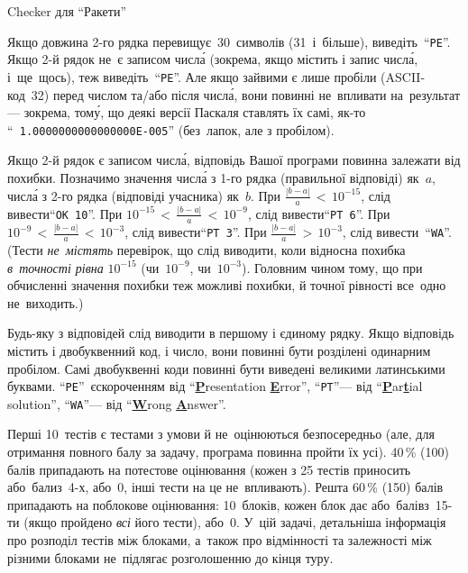 \begin{problemAllDefault}{Checker для ``Ракети''}
{
\OutputFile
Якщо довжина \mbox{2-го} рядка перевищує~30~символів (31~і~більше), виведіть~``\texttt{PE}''. Якщо \mbox{2-й} рядок не~є записом числ\'{а} (зокрема, якщо містить і запис числ\'{а}, і~ще~щось), теж виведіть~``\texttt{PE}''. 
Але якщо зайвими є лише пробіли (ASCII-код~32) перед числом та/або після числ\'{а}, вони повинні не~впливати на~результат\nolinebreak[3] --- зокрема, том\'{у}, що деякі версії Паскаля ставлять їх самі, як-то \mbox{``\texttt{~1.0000000000000000E-005}''} (без~лапок, але з пробілом).

Якщо \mbox{2-й} рядок є записом числ\'{а}, відповідь Вашої програми повинна залежати від похибки. Позначимо значення числ\'{а} з \mbox{1-го} рядка (правильної відповіді) як~$a$, числ\'{а} з \mbox{2-го} рядка (відповіді учасника) як~$b$. При $\frac{|b-a|}{a}\,{<}\,10^{-15}$, слід вивести\nolinebreak[3] ``\texttt{OK~10}''. 
При $10^{-15}\,{<}\,\frac{|b-a|}{a}\,{<}\,10^{-9}$, слід вивести\nolinebreak[3] ``\texttt{PT~6}''. 
При $10^{-9}\,{<}\,\frac{|b-a|}{a}\,{<}\,10^{-3}$, слід вивести\nolinebreak[3] ``\texttt{PT~3}''. 
При $\frac{|b-a|}{a}\,{>}\,10^{-3}$, слід вивести~``\texttt{WA}''. (Тести \emph{не~містять} перевірок, що слід виводити, коли відносна похибка \emph{в~точності рівна} $10^{-15}$ (чи~$10^{-9}$, чи~$10^{-3}$). Головним чином тому, що при обчисленні значення похибки теж можливі похибки, й точної рівності все~одно не~виходить.)

Будь-яку з відповідей слід виводити в першому і єдиному рядку. Якщо відповідь містить і двобуквенний код, і число, вони повинні бути розділені одинарним пробілом. Самі двобуквенні коди повинні бути виведені великими латинськими буквами. 
``\texttt{PE}''~є\nolinebreak[3] скороченням від ``\underline{\textbf{P}}resentation \underline{\textbf{E}}rror'', 
``\texttt{PT}''\nolinebreak[3] --- від ``\underline{\textbf{P}}ar\underline{\textbf{t}}ial solution'', 
``\texttt{WA}''\nolinebreak[3] --- від ``\underline{\textbf{W}}rong \underline{\textbf{A}}nswer''.

}

\Scoring
Перші 10~тестів є тестами з умови й не~оцінюються безпосередньо (але, для отримання повного балу за задачу, програма повинна пройти їх усі).
40$\,$\% (100) балів припадають на потестове оцінювання (кожен з 25 тестів приносить або~\mbox{бали}\nolinebreak[3] з~\mbox{4-х}, або~0, інші тести на це не~впливають). Решта 60$\,$\% (150) балів припадають на поблокове оцінювання: 10~блоків, кожен блок дає або~\mbox{балів}\nolinebreak[3] з~\mbox{15-ти} (якщо пройдено \emph{всі} його тести), або~0. У~цій задачі, детальніша інформація про розподіл тестів між блоками, а~також про відмінності та залежності між різними блоками не~підлягає розголошенню до кінця туру.


\end{problemAllDefault}

